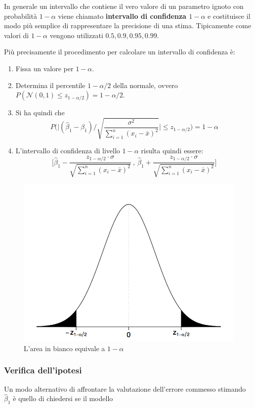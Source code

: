 In generale un intervallo che contiene il vero valore di un parametro ignoto con probabilità $ 1 - \alpha $ viene chiamato \textbf{intervallo di confidenza $ 1 - \alpha $} e costituisce il modo più semplice di rappresentare la precisione di una stima. Tipicamente come valori di $1 - \alpha $ vengono utilizzati $ 0.5, 0.9, 0.95, 0.99 $.

Più precisamente il procedimento per calcolare un intervallo di confidenza è:

\begin{enumerate}
	\item Fissa un valore per $ 1-\alpha $.
	\item Determina il percentile $ 1 - \alpha/2 $ della normale, ovvero $ P(\mathcal{N}(0,1) \leq z_{1 - \alpha/2}) = 1 - \alpha/2 $.
	\item Si ha quindi che 
	$$
	P\Bigg( \Bigg| (\hat{\beta}_1 - \beta_1) \Bigg/ \sqrt{\frac{\sigma^2}{\sum_{i=1}^n (x_i - \bar{x})^2}}\Bigg| \leq z_{1 - \alpha/2}\Bigg) = 1 - \alpha
	$$
	\item L'intervallo di confidenza di livello $ 1 - \alpha $ risulta quindi essere:
	$$
	\Bigg[ \hat{\beta}_1 - \frac{z_{1-\alpha/2} \cdot \sigma}{\sqrt{\sum_{i=1}^n (x_i - \bar{x})^2}} \: , \: \hat{\beta}_1 + \frac{z_{1-\alpha/2} \cdot \sigma}{\sqrt{\sum_{i=1}^n (x_i - \bar{x})^2}}\Bigg]
	$$
\end{enumerate}

\begin{figure}[htbp]
\centering
\includegraphics[width = .5\textwidth]{./notes/immagini/l5-fig1-1.png}
\caption{L'area in bianco equivale a $ 1 - \alpha $}
\end{figure}

\subsubsection{Verifica dell'ipotesi}

Un modo alternativo di affrontare la valutazione dell'errore commesso stimando $ \hat{\beta}_1 $ è quello di chiedersi se il modello


